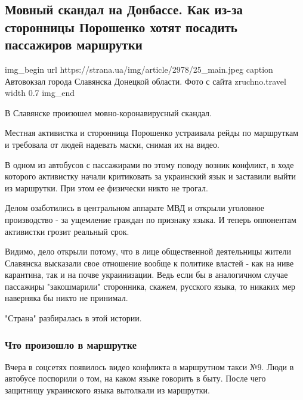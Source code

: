  
 
 

\subsection{Мовный скандал на Донбассе. Как из-за сторонницы Порошенко хотят посадить пассажиров маршрутки}
\label{sec:29_10_2020.news.ua.strana.1.mova_donbass_slavjansk}


\ifcmt
img_begin 
	url https://strana.ua/img/article/2978/25_main.jpeg
	caption Автовокзал города Славянска Донецкой области. Фото с сайта zruchno.travel 
	width 0.7
img_end
\fi

В Славянске произошел мовно-коронавирусный скандал.

Местная активистка и сторонница Порошенко устраивала рейды по маршруткам и
требовала от людей надевать маски, снимая их на видео.

В одном из автобусов с пассажирами по этому поводу возник конфликт, в ходе
которого активистку начали критиковать за украинский язык и заставили выйти из
маршрутки. При этом ее физически никто не трогал. 

Делом озаботились в центральном аппарате МВД и открыли уголовное производство -
за ущемление граждан по признаку языка. И теперь оппонентам активистки грозит
реальный срок. 

Видимо, дело открыли потому, что в лице общественной деятельницы жители
Славянска высказали свое отношение вообще к политике властей - как на ниве
карантина, так и на почве украинизации. Ведь если бы в аналогичном случае
пассажиры "закошмарили" сторонника, скажем, русского языка, то никаких мер
наверняка бы никто не принимал.

"Страна" разбиралась в этой истории.  

\subsubsection{Что произошло в маршрутке}

Вчера в соцсетях появилось видео конфликта в маршрутном такси №9. Люди в
автобусе поспорили о том, на каком языке говорить в быту. После чего защитницу
украинского языка вытолкали из маршрутки. 

